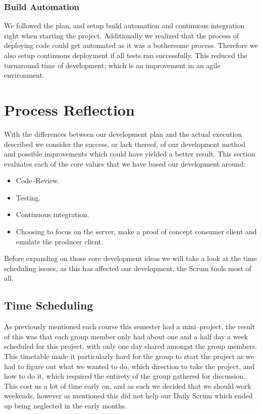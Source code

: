 \subsubsection{Build Automation}
We followed the plan, and setup build automation and continuous integration right when starting the project. 
Additionally we realized that the process of deploying code could get automated as it was a bothersome process.
Therefore we also setup continuous deployment if all tests ran successfully.
This reduced the turnaround time of development, which is an improvement in an agile environment.

\section{Process Reflection}
With the differences between our development plan and the actual execution described we consider the success, or lack thereof, of our development method and possible improvements which could have yielded a better result.
This section evaluates each of the core values that we have based our development around:
\begin{itemize}
    \item Code--Review.
    \item Testing.
    \item Continuous integration.
    \item Choosing to focus on the server, make a proof of concept consumer client and emulate the producer client.
\end{itemize}
Before expanding on those core development ideas we will take a look at the time scheduling issues, as this has affected our development, the Scrum tools most of all.
\subsection{Time Scheduling}\label{sub:time_scheduling}
As previously mentioned each course this semester had a mini--project, the result of this was that each group member only had about one and a half day a week scheduled for this project, with only one day shared amongst the group members.
This timetable made it particularly hard for the group to start the project as we had to figure out what we wanted to do, which direction to take the project, and how to do it, which required the entirety of the group gathered for discussion.
This cost us a lot of time early on, and as such we decided that we should work weekends, however as mentioned this did not help our Daily Scrum which ended up being neglected in the early months.

